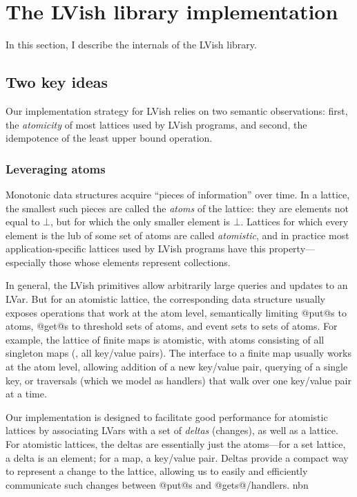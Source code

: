 \section{The LVish library implementation}\label{s:lvish-internals}

In this section, I describe the internals of the LVish
library. 

\subsection{Two key ideas}

Our implementation strategy for LVish relies on two semantic
observations: first, the \emph{atomicity} of most lattices used by
LVish programs, and second, the idempotence of the least upper bound
operation.


\subsubsection{Leveraging atoms}

Monotonic data structures acquire ``pieces of information'' over time.
In a lattice, the smallest such pieces are called the \emph{atoms} of
the lattice: they are elements not equal to $\bot$, but for which the
only smaller element is $\bot$.  Lattices for which every element is
the lub of some set of atoms are called \emph{atomistic}, and in
practice most application-specific lattices used by LVish programs
have this property---especially those whose elements represent
collections.

In general, the LVish primitives allow arbitrarily large queries and
updates to an LVar.  But for an atomistic lattice, the corresponding
data structure usually exposes operations that work at the atom level,
semantically limiting @put@s to atoms, @get@s to threshold sets of
atoms, and event sets to sets of atoms.  For example, the lattice of
finite maps is atomistic, with atoms consisting of all singleton maps
(\ie, all key/value pairs).  The interface to a finite map usually
works at the atom level, allowing addition of a new key/value pair,
querying of a single key, or traversals (which we model as handlers)
that walk over one key/value pair at a time.

Our implementation is designed to facilitate good performance for
atomistic lattices by associating LVars with a set of \emph{deltas}
(changes), as well as a lattice.  For atomistic lattices, the deltas
are essentially just the atoms---for a set lattice, a delta is an
element; for a map, a key/value pair.  Deltas provide a compact way to
represent a change to the lattice, allowing us to easily and
efficiently communicate such changes between @put@s and
@gets@/handlers.
nbn

